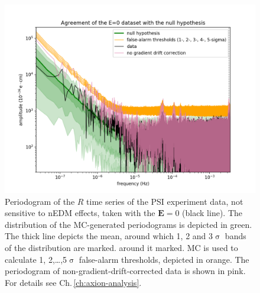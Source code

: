 \begin{figure}[h!]
  \centering
  \includegraphics[width=\linewidth]{gfx/axions/E0_detection_and_no_GDC.png}
  \caption{Periodogram of the $R$ time series of the PSI experiment data, not sensitive to nEDM effects, taken with the $\mathbf{E} = 0$ (black line).
  The distribution of the MC-generated periodograms is depicted in green. The thick line depicts the mean, around which 1, 2 and 3$\upsigma$ bands of the distribution are marked. around it marked. MC is used to calculate 1, 2,…,5$\upsigma$ false-alarm thresholds, depicted in orange.
  The periodogram of non-gradient-drift-corrected data is shown in pink. For details see Ch.\,\ref{ch:axion-analysis}.}\label{fig:app_E0_periodogram}
\end{figure}


